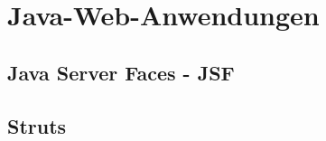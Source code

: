 \section{Java-Web-Anwendungen} \label{sec:tech-WebAnwendungen}
		\subsection{Java Server Faces - JSF}
		\subsection{Struts}


























\label{sec:tech-WebAnwendungen-ende}